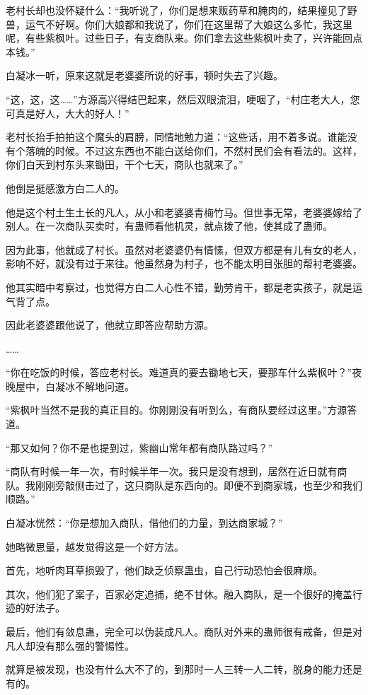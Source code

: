 \begin{this_body}
老村长却也没怀疑什么：“我听说了，你们是想来贩药草和腌肉的，结果撞见了野兽，运气不好啊。你们大娘都和我说了，你们在这里帮了大娘这么多忙，我这里呢，有些紫枫叶。过些日子，有支商队来。你们拿去这些紫枫叶卖了，兴许能回点本钱。”

白凝冰一听，原来这就是老婆婆所说的好事，顿时失去了兴趣。

“这，这，这……”方源高兴得结巴起来，然后双眼流泪，哽咽了，“村庄老大人，您可真是好人，大大的好人！”

老村长抬手拍拍这个魔头的肩膀，同情地勉力道：“这些话，用不着多说。谁能没有个落魄的时候。不过这东西也不能白送给你们，不然村民们会有看法的。这样，你们白天到村东头来锄田，干个七天，商队也就来了。”

他倒是挺感激方白二人的。

他是这个村土生土长的凡人，从小和老婆婆青梅竹马。但世事无常，老婆婆嫁给了别人。在一次商队买卖时，有蛊师看他机灵，就点拨了他，使其成了蛊师。

因为此事，他就成了村长。虽然对老婆婆仍有情愫，但双方都是有儿有女的老人，影响不好，就没有过于来往。他虽然身为村子，也不能太明目张胆的帮衬老婆婆。

他其实暗中考察过，也觉得方白二人心性不错，勤劳肯干，都是老实孩子，就是运气背了点。

因此老婆婆跟他说了，他就立即答应帮助方源。

……

“你在吃饭的时候，答应老村长。难道真的要去锄地七天，要那车什么紫枫叶？”夜晚屋中，白凝冰不解地问道。

“紫枫叶当然不是我的真正目的。你刚刚没有听到么，有商队要经过这里。”方源答道。

“那又如何？你不是也提到过，紫幽山常年都有商队路过吗？”

“商队有时候一年一次，有时候半年一次。我只是没有想到，居然在近日就有商队。我刚刚旁敲侧击过了，这只商队是东西向的。即便不到商家城，也至少和我们顺路。”

白凝冰恍然：“你是想加入商队，借他们的力量，到达商家城？”

她略微思量，越发觉得这是一个好方法。

首先，地听肉耳草损毁了，他们缺乏侦察蛊虫，自己行动恐怕会很麻烦。

其次，他们犯了案子，百家必定追捕，绝不甘休。融入商队，是一个很好的掩盖行迹的好法子。

最后，他们有敛息蛊，完全可以伪装成凡人。商队对外来的蛊师很有戒备，但是对凡人却没有那么强的警惕性。

就算是被发现，也没有什么大不了的，到那时一人三转一人二转，脱身的能力还是有的。


\end{this_body}
